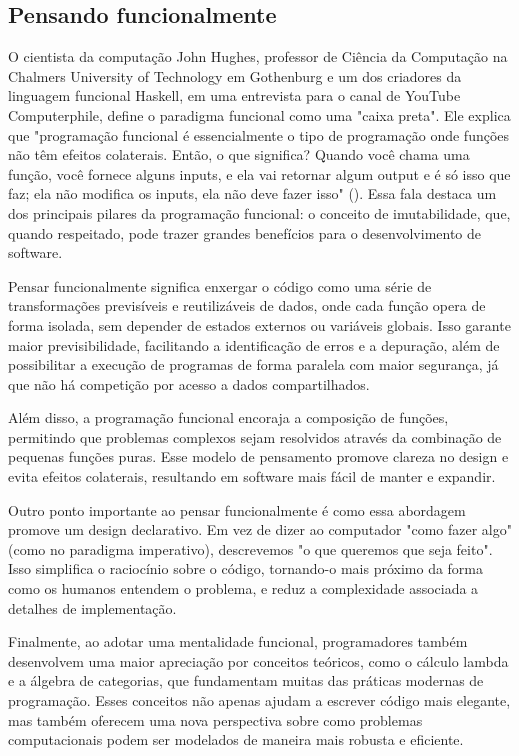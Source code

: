 \subsection{Pensando funcionalmente}
O cientista da computação John Hughes, professor de Ciência da Computação na Chalmers University of Technology em Gothenburg e um dos criadores da linguagem funcional Haskell, em uma entrevista para o canal de YouTube Computerphile, define o paradigma funcional como uma "caixa preta". Ele explica que "programação funcional é essencialmente o tipo de programação onde funções não têm efeitos colaterais. Então, o que significa? Quando você chama uma função, você fornece alguns inputs, e ela vai retornar algum output e é só isso que faz; ela não modifica os inputs, ela não deve fazer isso" (). Essa fala destaca um dos principais pilares da programação funcional: o conceito de imutabilidade, que, quando respeitado, pode trazer grandes benefícios para o desenvolvimento de software.

Pensar funcionalmente significa enxergar o código como uma série de transformações previsíveis e reutilizáveis de dados, onde cada função opera de forma isolada, sem depender de estados externos ou variáveis globais. Isso garante maior previsibilidade, facilitando a identificação de erros e a depuração, além de possibilitar a execução de programas de forma paralela com maior segurança, já que não há competição por acesso a dados compartilhados.

Além disso, a programação funcional encoraja a composição de funções, permitindo que problemas complexos sejam resolvidos através da combinação de pequenas funções puras. Esse modelo de pensamento promove clareza no design e evita efeitos colaterais, resultando em software mais fácil de manter e expandir.

Outro ponto importante ao pensar funcionalmente é como essa abordagem promove um design declarativo. Em vez de dizer ao computador "como fazer algo" (como no paradigma imperativo), descrevemos "o que queremos que seja feito". Isso simplifica o raciocínio sobre o código, tornando-o mais próximo da forma como os humanos entendem o problema, e reduz a complexidade associada a detalhes de implementação.

Finalmente, ao adotar uma mentalidade funcional, programadores também desenvolvem uma maior apreciação por conceitos teóricos, como o cálculo lambda e a álgebra de categorias, que fundamentam muitas das práticas modernas de programação. Esses conceitos não apenas ajudam a escrever código mais elegante, mas também oferecem uma nova perspectiva sobre como problemas computacionais podem ser modelados de maneira mais robusta e eficiente.

